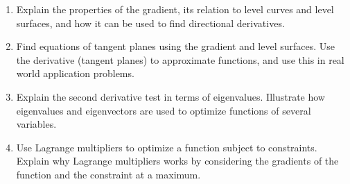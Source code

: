 
\begin{enumerate}
\item Explain the properties of the gradient, its relation to level
  curves and level surfaces, and how it can be used to find
  directional derivatives.  
\item Find equations of tangent planes using the gradient and level
  surfaces. Use the derivative (tangent planes) to approximate
  functions, and use this in real world application problems.
\item Explain the second derivative test in terms of eigenvalues.
  Illustrate how eigenvalues and eigenvectors are used to optimize
  functions of several variables.
\item Use Lagrange multipliers to optimize a function subject to
  constraints.  Explain why Lagrange multipliers works by considering
  the gradients of the function and the constraint at a maximum.
\end{enumerate}


